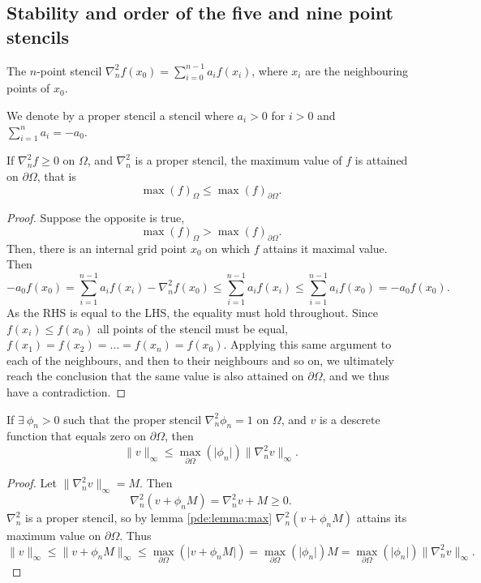 \newcommand{\inorm}[1]{
\lVert #1 \rVert_\infty
}

\subsection{Stability and order of the five and nine point stencils}
\begin{definition}
  The $n$-point stencil $\nabla_n^2 f(x_0) = \sum_{i=0}^{n-1} a_i f(x_i)$,
  where $x_i$ are the neighbouring points of $x_0$.
\end{definition}

\begin{definition}
  We denote by a proper stencil a stencil where $a_i > 0$ for $i>0$ and $\sum_{i=1}^n a_i = -a_0$.
\end{definition}

\begin{lemma}\label{pde:lemma:max}
If $\nabla_n^2 f \geq 0$ on $\Omega$, and $\nabla_n^2$ is a proper stencil, the maximum value of $f$ is attained on $\partial \Omega$, that is
$$
\max(f)_\Omega \leq \max(f)_{\partial \Omega}.
$$
\end{lemma}
\begin{proof}
Suppose the opposite is true,
$$
\max(f)_\Omega > \max(f)_{\partial \Omega}.
$$
Then, there is an internal grid point $x_0$ on which $f$ attains it maximal value.
Then
\begin{equation}
  -a_0 f(x_0)
  = \sum_{i=1}^{n-1} a_i f(x_i) - \nabla_n^2 f(x_0)
  \leq \sum_{i=1}^{n-1} a_i f(x_i)
  \leq \sum_{i=1}^{n-1} a_i f(x_0)
  = -a_0 f(x_0).
\end{equation}
As the RHS is equal to the LHS, the equality must hold throughout.
Since $f(x_i) \leq f(x_0)$ all points of the stencil must be equal, $f(x_1) = f(x_2) = \dots = f(x_n) = f(x_0)$.
Applying this same argument to each of the neighbours, and then to their neighbours and so on, we ultimately reach the conclusion that the same value is also attained on $\partial \Omega$, and we thus have a contradiction.
\end{proof}

\begin{lemma}\label{pde:lemma:bound}
  If $\exists ~ \phi_n > 0$ such that the proper stencil $\nabla_n^2 \phi_n = 1$ on $\Omega$, and $v$ is a descrete function that equals zero on $\partial \Omega$, then
  \begin{equation}
    \inorm{v} \leq \max_{\partial\Omega}(\lvert \phi_n \rvert)
    \inorm{\nabla_n^2 v}.
  \end{equation}
\end{lemma}
\begin{proof}

Let $\inorm{\nabla_n^2 v} = M$.
Then
$$
\nabla_n^2 (v + \phi_n M) = \nabla_n^2 v +  M \geq 0.
$$
$\nabla_n^2$ is a proper stencil, so by lemma \ref{pde:lemma:max} $\nabla_n^2 (v + \phi_n M)$ attains its maximum value on $\partial \Omega$.
Thus
$$
\inorm{v}
\leq \inorm{v + \phi_n M}
\leq \max_{\partial \Omega}(\lvert v + \phi_n M\rvert)
= \max_{\partial\Omega} (\lvert \phi_n \rvert) M
= \max_{\partial\Omega} (\lvert \phi_n \rvert) \inorm{\nabla_n^2 v}.
$$
\end{proof}


